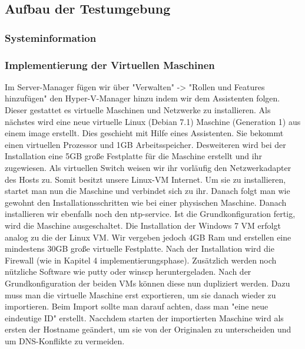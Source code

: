 %
\subsection{Aufbau der Testumgebung}
\subsubsection{Systeminformation}
\label{app:SysInfo}

\subsubsection{Implementierung der Virtuellen Maschinen}
Im Server-Manager fügen wir über "Verwalten" -> "Rollen und Features hinzufügen" den Hyper-V-Manager hinzu indem wir dem Assistenten folgen. Dieser gestattet es virtuelle Maschinen und Netzwerke zu installieren.
Als nächstes wird eine neue virtuelle Linux (Debian 7.1)  Maschine (Generation 1) aus einem image erstellt. Dies geschieht mit Hilfe eines Assistenten. Sie bekommt einen virtuellen Prozessor und 1GB Arbeitsspeicher. Desweiteren wird bei der Installation eine 5GB große Festplatte für die Maschine erstellt und ihr zugewiesen. Als virtuellen Switch weisen wir ihr vorläufig den Netzwerkadapter des Hosts zu. Somit besitzt unsere Linux-VM Internet. Um sie zu installieren, startet man nun die Maschine und verbindet sich zu ihr. Danach folgt man wie gewohnt den Installationsschritten wie bei einer physischen Maschine. Danach installieren wir ebenfalls noch den ntp-service. Ist die Grundkonfiguration fertig, wird die Maschine ausgeschaltet.
Die Installation der Windows 7 VM erfolgt analog zu die der Linux VM. Wir vergeben jedoch 4GB Ram und erstellen eine mindestens 30GB große virtuelle Festplatte. Nach der Installation wird die Firewall (wie in Kapitel 4 implementierungsphase). Zusätzlich werden noch nützliche Software wie putty oder winscp heruntergeladen.
Nach der Grundkonfiguration der beiden VMs können diese nun dupliziert werden. Dazu muss man die virtuelle Maschine erst exportieren, um sie danach wieder zu importieren. Beim Import sollte man darauf achten, dass man "eine neue eindeutige ID" erstellt. Nacchdem starten der importierten Maschine wird als ersten der Hostname geändert, um sie von der Originalen zu unterscheiden und um DNS-Konflikte zu vermeiden.

